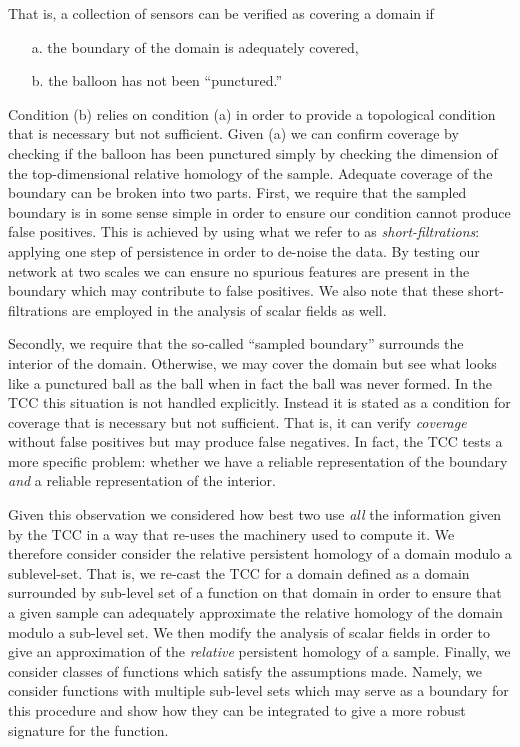 That is, a collection of sensors can be verified as covering a domain if
\begin{enumerate}
    \item[a.] the boundary of the domain is adequately covered,
    \item[b.] the balloon has not been ``punctured.''
\end{enumerate}
Condition (b) relies on condition (a) in order to provide a topological condition that is necessary but not sufficient.
Given (a) we can confirm coverage by checking if the balloon has been punctured simply by checking the dimension of the top-dimensional relative homology of the sample.
Adequate coverage of the boundary can be broken into two parts.
First, we require that the sampled boundary is in some sense simple in order to ensure our condition cannot produce false positives.
This is achieved by using what we refer to as \emph{short-filtrations}: applying one step of persistence in order to de-noise the data.
By testing our network at two scales we can ensure no spurious features are present in the boundary which may contribute to false positives.
We also note that these short-filtrations are employed in the analysis of scalar fields as well.

Secondly, we require that the so-called ``sampled boundary'' surrounds the interior of the domain.
Otherwise, we may cover the domain but see what looks like a punctured ball as the ball when in fact the ball was never formed.
In the TCC this situation is not handled explicitly.
Instead it is stated as a condition for coverage that is necessary but not sufficient.
That is, it can verify \emph{coverage} without false positives but may produce false negatives.
In fact, the TCC tests a more specific problem: whether we have a reliable representation of the boundary \emph{and} a reliable representation of the interior.

Given this observation we considered how best two use \emph{all} the information given by the TCC in a way that re-uses the machinery used to compute it.
We therefore consider consider the relative persistent homology of a domain modulo a sublevel-set.
That is, we re-cast the TCC for a domain defined as a domain surrounded by sub-level set of a function on that domain in order to ensure that a given sample can adequately approximate the relative homology of the domain modulo a sub-level set.
We then modify the analysis of scalar fields in order to give an approximation of the \emph{relative} persistent homology of a sample.
Finally, we consider classes of functions which satisfy the assumptions made.
Namely, we consider functions with multiple sub-level sets which may serve as a boundary for this procedure and show how they can be integrated to give a more robust signature for the function.
